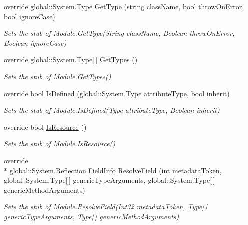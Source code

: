 \begin{DoxyCompactItemize}
override global\-::\-System.\-Type \hyperlink{class_system_1_1_reflection_1_1_fakes_1_1_stub_module_a70effea6413c17b2ac85364f686d1aca}{Get\-Type} (string class\-Name, bool throw\-On\-Error, bool ignore\-Case)
\begin{DoxyCompactList}\small\item\em Sets the stub of Module.\-Get\-Type(\-String class\-Name, Boolean throw\-On\-Error, Boolean ignore\-Case)\end{DoxyCompactList}\item 
override global\-::\-System.\-Type\mbox{[}$\,$\mbox{]} \hyperlink{class_system_1_1_reflection_1_1_fakes_1_1_stub_module_ad9bcfe91b0cf767e6a52fe8e93445ae2}{Get\-Types} ()
\begin{DoxyCompactList}\small\item\em Sets the stub of Module.\-Get\-Types()\end{DoxyCompactList}\item 
override bool \hyperlink{class_system_1_1_reflection_1_1_fakes_1_1_stub_module_a7bd85fbda0e9c884c5a7f0b1e914edd8}{Is\-Defined} (global\-::\-System.\-Type attribute\-Type, bool inherit)
\begin{DoxyCompactList}\small\item\em Sets the stub of Module.\-Is\-Defined(\-Type attribute\-Type, Boolean inherit)\end{DoxyCompactList}\item 
override bool \hyperlink{class_system_1_1_reflection_1_1_fakes_1_1_stub_module_a0d0d16bf68165de77a6324a602ed4d83}{Is\-Resource} ()
\begin{DoxyCompactList}\small\item\em Sets the stub of Module.\-Is\-Resource()\end{DoxyCompactList}\item 
override \\*
global\-::\-System.\-Reflection.\-Field\-Info \hyperlink{class_system_1_1_reflection_1_1_fakes_1_1_stub_module_aeda89eee73c8751b09246d765aedf993}{Resolve\-Field} (int metadata\-Token, global\-::\-System.\-Type\mbox{[}$\,$\mbox{]} generic\-Type\-Arguments, global\-::\-System.\-Type\mbox{[}$\,$\mbox{]} generic\-Method\-Arguments)
\begin{DoxyCompactList}\small\item\em Sets the stub of Module.\-Resolve\-Field(\-Int32 metadata\-Token, Type\mbox{[}$\,$\mbox{]} generic\-Type\-Arguments, Type\mbox{[}$\,$\mbox{]} generic\-Method\-Arguments)\end{DoxyCompactList}\item 

\end{DoxyCompactItemize}
